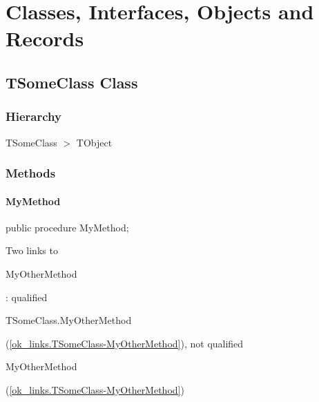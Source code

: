 \documentclass{report}
\newif\ifpdf
\begin{document}
\section{Classes, Interfaces, Objects and Records}
\ifpdf
\subsection*{\large{\textbf{TSomeClass Class}}\normalsize\hspace{1ex}\hrulefill}
\else
\subsection*{TSomeClass Class}
\fi
\label{ok_links.TSomeClass}
\subsubsection*{\large{\textbf{Hierarchy}}\normalsize\hspace{1ex}\hfill}
TSomeClass {$>$} TObject
\subsubsection*{\large{\textbf{Methods}}\normalsize\hspace{1ex}\hfill}
\paragraph*{MyMethod}\hspace*{\fill}

\label{ok_links.TSomeClass-MyMethod}
\begin{list}{}{
\setlength{\itemindent}{0cm}
\setlength{\listparindent}{0cm}
\setlength{\leftmargin}{\evensidemargin}
\addtolength{\leftmargin}{\tmplength}
\settowidth{\labelsep}{X}
\addtolength{\leftmargin}{\labelsep}
\setlength{\labelwidth}{\tmplength}
}
\item[\textbf{Declaration}\hfill]
\ifpdf
\begin{flushleft}
\fi
\begin{ttfamily}
public procedure MyMethod;\end{ttfamily}

\ifpdf
\end{flushleft}
\fi

\par
\item[\textbf{Description}]
Two links to \begin{ttfamily}MyOtherMethod\end{ttfamily} : qualified \begin{ttfamily}TSomeClass.MyOtherMethod\end{ttfamily}(\ref{ok_links.TSomeClass-MyOtherMethod}), not qualified \begin{ttfamily}MyOtherMethod\end{ttfamily}(\ref{ok_links.TSomeClass-MyOtherMethod})

\end{list}
\end{document}
